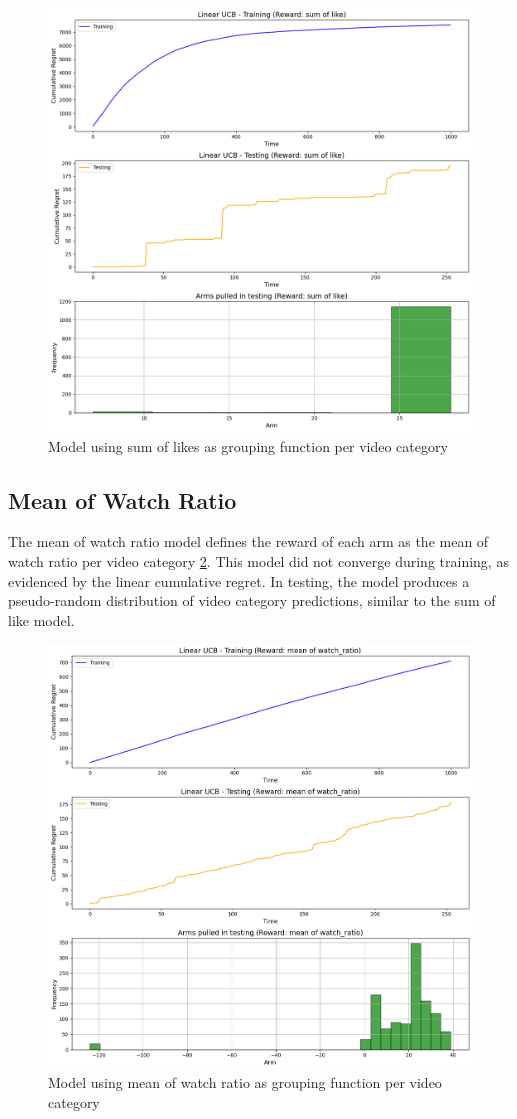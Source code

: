 \begin{figure}[H]
    \centering
    \includegraphics[width=0.5\linewidth]{summary_report/images/sum_like.png}
    \caption{Model using sum of likes as grouping function per video category}
    \label{sum_like}
\end{figure}

\subsection{Mean of Watch Ratio}

The mean of watch ratio model defines the reward of each arm as the mean of watch ratio per video category \ref{mean_watchratio}. This model did not converge during training, as evidenced by the linear cumulative regret. In testing, the model produces a pseudo-random distribution of video category predictions, similar to the sum of like model.

\begin{figure}[H]
    \centering
    \includegraphics[width=0.5\linewidth]{summary_report/images/mean_watchratio.png}
    \caption{Model using mean of watch ratio as grouping function per video category}
    \label{mean_watchratio}
\end{figure}

